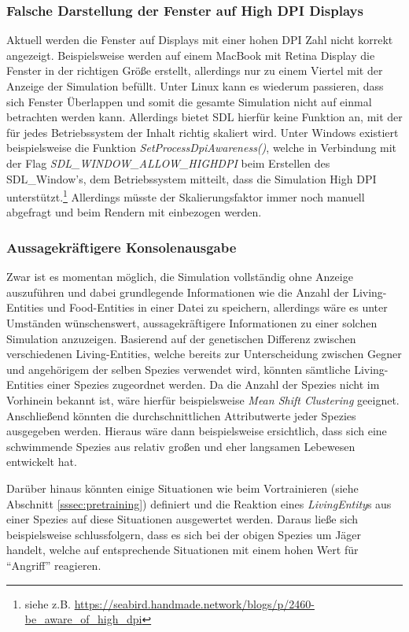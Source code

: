 \documentclass[course=erap]{aspdoc}
\begin{document}
\subsubsection{Falsche Darstellung der Fenster auf High DPI Displays}
Aktuell werden die Fenster auf Displays mit einer hohen DPI Zahl nicht korrekt angezeigt. Beispielsweise werden auf einem MacBook mit Retina Display die Fenster in der richtigen Größe erstellt, allerdings nur zu einem Viertel mit der Anzeige der Simulation befüllt. Unter Linux kann es wiederum passieren, dass sich Fenster Überlappen und somit die gesamte Simulation nicht auf einmal betrachten werden kann. Allerdings bietet SDL hierfür keine Funktion an, mit der für jedes Betriebssystem der Inhalt richtig skaliert wird. Unter Windows existiert beispielsweise die Funktion \emph{SetProcessDpiAwareness()}, welche in Verbindung mit der Flag \emph{SDL\_WINDOW\_ALLOW\_HIGHDPI} beim Erstellen des SDL\_Window's, dem Betriebssystem mitteilt, dass die Simulation High DPI unterstützt.\footnote{siehe z.B. \href{https://seabird.handmade.network/blogs/p/2460-be_aware_of_high_dpi}{https://seabird.handmade.network/blogs/p/2460-be\_aware\_of\_high\_dpi}} Allerdings müsste der Skalierungsfaktor immer noch manuell abgefragt und beim Rendern mit einbezogen werden.

\subsubsection{Aussagekräftigere Konsolenausgabe}
Zwar ist es momentan möglich, die Simulation vollständig ohne Anzeige auszuführen und dabei grundlegende Informationen wie die Anzahl der Living-Entities und Food-Entities in einer Datei zu speichern, allerdings wäre es unter Umständen wünschenswert, aussagekräftigere Informationen zu einer solchen Simulation anzuzeigen. Basierend auf der genetischen Differenz zwischen verschiedenen Living-Entities, welche bereits zur Unterscheidung zwischen Gegner und angehörigem der selben Spezies verwendet wird, könnten sämtliche Living-Entities einer Spezies zugeordnet werden. Da die Anzahl der Spezies nicht im Vorhinein bekannt ist, wäre hierfür beispielsweise \emph{Mean Shift Clustering} geeignet. Anschließend könnten die durchschnittlichen Attributwerte jeder Spezies ausgegeben werden. Hieraus wäre dann beispielsweise ersichtlich, dass sich eine schwimmende Spezies aus relativ großen und eher langsamen Lebewesen entwickelt hat.

Darüber hinaus könnten einige Situationen wie beim Vortrainieren (siehe Abschnitt \ref{sssec:pretraining}) definiert und die Reaktion eines \emph{LivingEntity}s aus einer Spezies auf diese Situationen ausgewertet werden. Daraus ließe sich beispielsweise schlussfolgern, dass es sich bei der obigen Spezies um Jäger handelt, welche auf entsprechende Situationen mit einem hohen Wert für "`Angriff"' reagieren.
\end{document}
